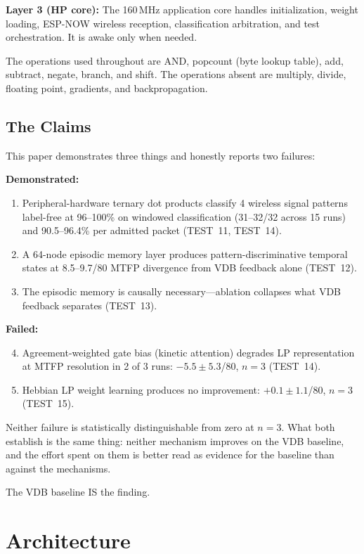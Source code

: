 \documentclass[11pt,letterpaper]{article}
\begin{document}
\textbf{Layer 3 (HP core):} The 160\,MHz application core handles initialization, weight loading, ESP-NOW wireless reception, classification arbitration, and test orchestration. It is awake only when needed.

The operations used throughout are AND, popcount (byte lookup table), add, subtract, negate, branch, and shift. The operations absent are multiply, divide, floating point, gradients, and backpropagation.

\subsection{The Claims}

This paper demonstrates three things and honestly reports two failures:

\noindent\textbf{Demonstrated:}
\begin{enumerate}
\item Peripheral-hardware ternary dot products classify 4 wireless signal patterns label-free at 96--100\% on windowed classification (31--32/32 across 15 runs) and 90.5--96.4\% per admitted packet (TEST~11, TEST~14).
\item A 64-node episodic memory layer produces pattern-discriminative temporal states at 8.5--9.7/80 MTFP divergence from VDB feedback alone (TEST~12).
\item The episodic memory is causally necessary---ablation collapses what VDB feedback separates (TEST~13).
\end{enumerate}

\noindent\textbf{Failed:}
\begin{enumerate}
\setcounter{enumi}{3}
\item Agreement-weighted gate bias (kinetic attention) degrades LP representation at MTFP resolution in 2 of 3 runs: $-5.5 \pm 5.3$/80, $n=3$ (TEST~14).
\item Hebbian LP weight learning produces no improvement: $+0.1 \pm 1.1$/80, $n=3$ (TEST~15).
\end{enumerate}

Neither failure is statistically distinguishable from zero at $n=3$. What both establish is the same thing: neither mechanism improves on the VDB baseline, and the effort spent on them is better read as evidence for the baseline than against the mechanisms.

The VDB baseline IS the finding.

\section{Architecture}
\end{document}
